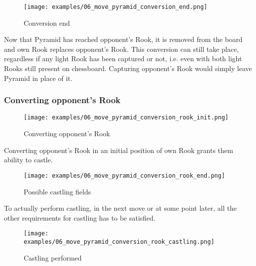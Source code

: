 \clearpage %

\noindent
\begin{figure}[!h]
\texttt{[image: examples/06\_move\_pyramid\_conversion\_end.png]}
\caption{Conversion end}
\label{fig:06_move_pyramid_conversion_end}
\end{figure}

Now that Pyramid has reached opponent's Rook, it is removed from the board and
own Rook replaces opponent's Rook. This conversion can still take place, regardless
if any light Rook has been captured or not, i.e. even with both light Rooks still
present on chessboard. Capturing opponent's Rook would simply leave Pyramid in
place of it.

\clearpage %

\subsubsection*{Converting opponent's Rook}

\noindent
\begin{figure}[!h]
\texttt{[image: examples/06\_move\_pyramid\_conversion\_rook\_init.png]}
\caption{Converting opponent's Rook}
\label{fig:06_move_pyramid_conversion_rook_init}
\end{figure}

Converting opponent's Rook in an initial position of own Rook grants them ability to castle.

\noindent
\begin{figure}[!h]
\texttt{[image: examples/06\_move\_pyramid\_conversion\_rook\_end.png]}
\caption{Possible castling fields}
\label{fig:06_move_pyramid_conversion_rook_end}
\end{figure}

To actually perform castling, in the next move or at some point later, all the other
requirements for castling has to be satisfied.

\noindent
\begin{figure}[!h]
\texttt{[image: examples/06\_move\_pyramid\_conversion\_rook\_castling.png]}
\caption{Castling performed}
\label{fig:06_move_pyramid_conversion_rook_castling}
\end{figure}

